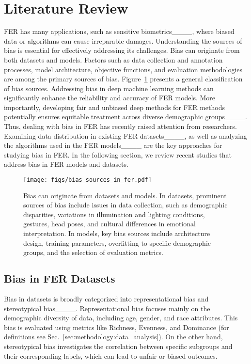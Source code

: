 \section{Literature Review}
\label{sec:literature_review}
FER has many applications, such as sensitive biometrics____, where biased data or algorithms can cause irreparable damages. Understanding the sources of bias is essential for effectively addressing its challenges. Bias can originate from both datasets and models. Factors such as data collection and annotation processes, model architecture, objective functions, and evaluation methodologies are among the primary sources of bias. Figure~\ref{fig:bias_sources_in_fer} presents a general classification of bias sources. Addressing bias in deep machine learning methods can significantly enhance the reliability and accuracy of FER models. More importantly, developing fair and unbiased deep methods for FER methods potentially ensures equitable treatment across diverse demographic groups____. Thus, dealing with bias in FER has recently raised attention from researchers. Examining data distribution in existing FER datasets____, as well as analyzing the algorithms used in the FER 
 models____ are the key approaches for studying bias in FER. In the following section, we review recent studies that address bias in FER models and datasets.

\begin{figure}[b!]
\centering
\caption{Bias can originate from datasets and models. In datasets, prominent sources of bias include issues in data collection, such as demographic disparities, variations in illumination and lighting conditions, gestures, head poses, and cultural differences in emotional interpretation. In models, key bias sources include architecture design, training parameters, overfitting to specific demographic groups, and the selection of evaluation metrics.}
\texttt{[image: figs/bias\_sources\_in\_fer.pdf]}
\label{fig:bias_sources_in_fer}
\end{figure}

\subsection{Bias in FER Datasets} 
\label{sec:literature_review:bias_in_fer_datasets}
Bias in datasets is broadly categorized into representational bias and stereotypical bias____. Representational bias focuses mainly on the demographic diversity of data, including age, gender, and race attributes. This bias is evaluated using metrics like Richness, Evenness, and Dominance (for definitions see Sec.~\ref{sec:methodology:data_analysis}). On the other hand, stereotypical bias investigates the correlation between specific subgroups and their corresponding labels, which can lead to unfair or biased outcomes. 

